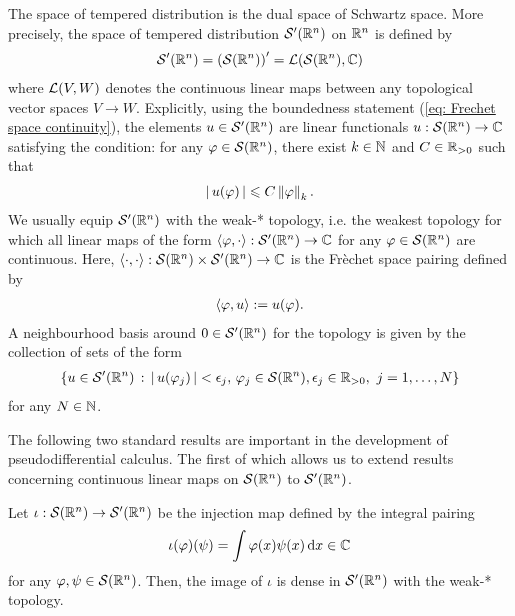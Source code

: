 \documentclass[12pt]{article}
\begin{document}
\begin{fdefinition}
    The space of tempered distribution is the dual space of Schwartz space. More precisely, the space of tempered distribution $\sch'(\R^n)$ on $\R^n$ is defined by 
    \begin{align*}
    \sch'(\R^n) = \brac{\sch(\R^n)}' = \L(\sch(\R^n),\C)
    \end{align*}
    where $\L(V, W)$ denotes the continuous linear maps between any topological vector spaces $V \to W$. Explicitly, using the boundedness statement (\ref{eq: Frechet space continuity}), the elements $u \in \sch'(\R^n)$ are linear functionals $u : \sch(\R^n) \to \C$ satisfying the condition: for any $\varphi \in \sch(\R^n)$, there exist $k \in \N$ and $C \in \R_{> 0}$ such that 
    \begin{align*}
    \abs{u(\varphi)} \leq C \norm[\varphi]_k. 
    \end{align*}
    We usually equip $\sch'(\R^n)$ with the weak-* topology, i.e. the weakest topology for which all linear maps of the form $\inprod[\varphi, \cdot] : \sch'(\R^n) \to \C$ for any $\varphi \in \sch(\R^n)$ are continuous. Here,  $\inprod : \sch(\R^n) \times \sch'(\R^n) \to \C$ is the Fr\`echet space pairing defined by
    \begin{align*}
    \inprod[\varphi, u] := u(\varphi). 
    \end{align*}
    A neighbourhood basis around $0 \in \sch'(\R^n)$ for the topology is given by the collection of sets of the form
    \begin{align*}
    \set{u \in \sch'(\R^n) \wh \abs{u(\varphi_j)} < \epsilon_j, \, \varphi_j \in \sch(\R^n), \epsilon_j \in \R_{> 0}, \, \, j = 1, \dots, N}
    \end{align*}
    for any $N \in \N$. 
\end{fdefinition}

The following two standard results are important in the development of pseudodifferential calculus. The first of which allows us to extend results concerning continuous linear maps on $\sch(\R^n)$ to $\sch'(\R^n)$. 
\begin{flemma} \label{lemma: density of schwartz in tempered}
    Let $\iota : \sch(\R^n) \to \sch'(\R^n)$ be the injection map defined by the integral pairing 
    \begin{align*}
    \iota(\varphi)(\psi) = \int \varphi(x) \psi(x) \d[x] \in \C
    \end{align*}
    for any $\varphi, \psi \in \sch(\R^n)$. Then, the image of $\iota$ is dense in $\sch'(\R^n)$ with the weak-* topology. 
\end{flemma}    
\end{document}
